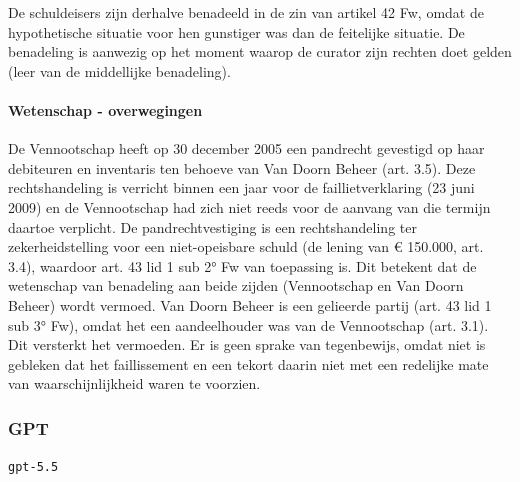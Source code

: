 \documentclass[
  dutch,
  a4paper,
]{article}
\begin{document}
De schuldeisers zijn derhalve benadeeld in de zin van artikel 42 Fw, omdat de hypothetische situatie voor hen gunstiger was dan de feitelijke situatie. De benadeling is aanwezig op het moment waarop de curator zijn rechten doet gelden (leer van de middellijke benadeling).

\paragraph{Wetenschap - overwegingen}\label{wetenschap---overwegingen-3}

De Vennootschap heeft op 30 december 2005 een pandrecht gevestigd op haar debiteuren en inventaris ten behoeve van Van Doorn Beheer (art. 3.5). Deze rechtshandeling is verricht binnen een jaar voor de faillietverklaring (23 juni 2009) en de Vennootschap had zich niet reeds voor de aanvang van die termijn daartoe verplicht. De pandrechtvestiging is een rechtshandeling ter zekerheidstelling voor een niet-opeisbare schuld (de lening van € 150.000, art. 3.4), waardoor art. 43 lid 1 sub 2° Fw van toepassing is. Dit betekent dat de wetenschap van benadeling aan beide zijden (Vennootschap en Van Doorn Beheer) wordt vermoed. Van Doorn Beheer is een gelieerde partij (art. 43 lid 1 sub 3° Fw), omdat het een aandeelhouder was van de Vennootschap (art. 3.1). Dit versterkt het vermoeden. Er is geen sprake van tegenbewijs, omdat niet is gebleken dat het faillissement en een tekort daarin niet met een redelijke mate van waarschijnlijkheid waren te voorzien.

\newpage


\subsubsection{GPT}\label{gpt-1}

\texttt{gpt-5.5}
\end{document}
